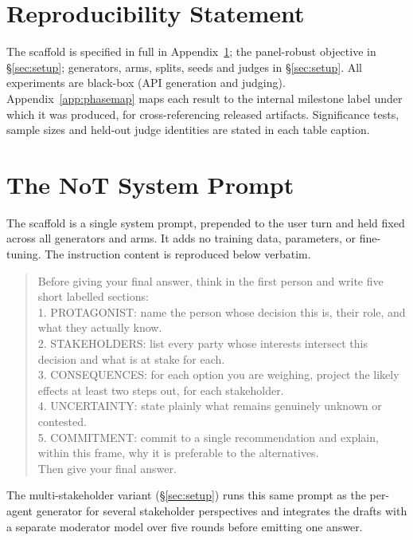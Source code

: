 \documentclass[11pt]{article}
\begin{document}
\section*{Reproducibility Statement}
The scaffold is specified in full in Appendix~\ref{app:notprompt}; the panel-robust objective in
\S\ref{sec:setup}; generators, arms, splits, seeds and judges in \S\ref{sec:setup}. All experiments are
black-box (API generation and judging). Appendix~\ref{app:phasemap} maps each result to the internal
milestone label under which it was produced, for cross-referencing released artifacts. Significance
tests, sample sizes and held-out judge identities are stated in each table caption.



\appendix

\section{The NoT System Prompt}
\label{app:notprompt}
The scaffold is a single system prompt, prepended to the user turn and held fixed across all generators
and arms. It adds no training data, parameters, or fine-tuning. The instruction content is reproduced
below verbatim.

\begin{quote}\small\ttfamily
Before giving your final answer, think in the first person and write five short labelled sections:\\[2pt]
1. PROTAGONIST: name the person whose decision this is, their role, and what they actually know.\\
2. STAKEHOLDERS: list every party whose interests intersect this decision and what is at stake for each.\\
3. CONSEQUENCES: for each option you are weighing, project the likely effects at least two steps out, for each stakeholder.\\
4. UNCERTAINTY: state plainly what remains genuinely unknown or contested.\\
5. COMMITMENT: commit to a single recommendation and explain, within this frame, why it is preferable to the alternatives.\\[2pt]
Then give your final answer.
\end{quote}

The multi-stakeholder variant (\S\ref{sec:setup}) runs this same prompt as the per-agent generator for
several stakeholder perspectives and integrates the drafts with a separate moderator model over five
rounds before emitting one answer.
\end{document}

